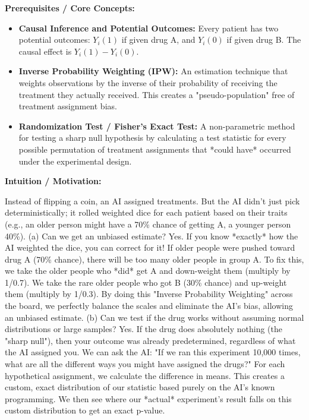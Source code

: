 \begin{solution}
\textbf{Prerequisites / Core Concepts:}
\begin{itemize}
    \item \textbf{Causal Inference and Potential Outcomes:} Every patient has two potential outcomes: $Y_i(1)$ if given drug A, and $Y_i(0)$ if given drug B. The causal effect is $Y_i(1) - Y_i(0)$.
    \item \textbf{Inverse Probability Weighting (IPW):} An estimation technique that weights observations by the inverse of their probability of receiving the treatment they actually received. This creates a "pseudo-population" free of treatment assignment bias.
    \item \textbf{Randomization Test / Fisher's Exact Test:} A non-parametric method for testing a sharp null hypothesis by calculating a test statistic for every possible permutation of treatment assignments that *could have* occurred under the experimental design.
\end{itemize}

\textbf{Intuition / Motivation:}

Instead of flipping a coin, an AI assigned treatments. But the AI didn't just pick deterministically; it rolled weighted dice for each patient based on their traits (e.g., an older person might have a 70\% chance of getting A, a younger person 40\%).
(a) Can we get an unbiased estimate? Yes. If you know *exactly* how the AI weighted the dice, you can correct for it! If older people were pushed toward drug A (70\% chance), there will be too many older people in group A. To fix this, we take the older people who *did* get A and down-weight them (multiply by 1/0.7). We take the rare older people who got B (30\% chance) and up-weight them (multiply by 1/0.3). By doing this "Inverse Probability Weighting" across the board, we perfectly balance the scales and eliminate the AI's bias, allowing an unbiased estimate.
(b) Can we test if the drug works without assuming normal distributions or large samples? Yes. If the drug does absolutely nothing (the "sharp null"), then your outcome was already predetermined, regardless of what the AI assigned you. We can ask the AI: "If we ran this experiment 10,000 times, what are all the different ways you might have assigned the drugs?" For each hypothetical assignment, we calculate the difference in means. This creates a custom, exact distribution of our statistic based purely on the AI's known programming. We then see where our *actual* experiment's result falls on this custom distribution to get an exact p-value.


\end{solution}
